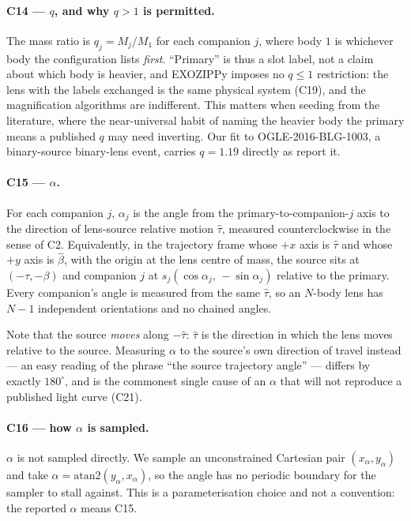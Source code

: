 \paragraph{C14 --- $q$, and why $q > 1$ is permitted.}  The mass ratio is
$q_j = M_j / M_1$ for each companion $j$, where body $1$ is whichever body
the configuration lists \emph{first}.  ``Primary'' is thus a slot label, not
a claim about which body is heavier, and EXOZIPPy imposes no $q \le 1$
restriction: the lens with the labels exchanged is the same physical system
(C19), and the magnification algorithms are indifferent.  This matters when
seeding from the literature, where the near-universal habit of naming the
heavier body the primary means a published $q$ may need inverting.  Our fit
to OGLE-2016-BLG-1003, a binary-source binary-lens event, carries
$q = 1.19$ directly as \citet{Jung:2017} report it.

\paragraph{C15 --- $\alpha$.}  For each companion $j$, $\alpha_j$ is the
angle from the primary-to-companion-$j$ axis to the direction of
lens-source relative motion $\hat{\tau}$, measured counterclockwise in the
sense of C2.  Equivalently, in the trajectory frame whose $+x$ axis is
$\hat{\tau}$ and whose $+y$ axis is $\hat{\beta}$, with the origin at the
lens centre of mass, the source sits at $(-\tau, -\beta)$ and companion $j$
at $s_j(\cos\alpha_j,\, -\sin\alpha_j)$ relative to the primary.  Every
companion's angle is measured from the same $\hat{\tau}$, so an $N$-body
lens has $N-1$ independent orientations and no chained angles.

Note that the source \emph{moves} along $-\hat{\tau}$: $\hat{\tau}$ is the
direction in which the lens moves relative to the source.  Measuring
$\alpha$ to the source's own direction of travel instead --- an easy reading
of the phrase ``the source trajectory angle'' --- differs by exactly
$180^\circ$, and is the commonest single cause of an $\alpha$ that will not
reproduce a published light curve (C21).

\paragraph{C16 --- how $\alpha$ is sampled.}  $\alpha$ is not sampled
directly.  We sample an unconstrained Cartesian pair
$(x_\alpha, y_\alpha)$ and take $\alpha = \mathrm{atan2}(y_\alpha, x_\alpha)$, so
the angle has no periodic boundary for the sampler to stall against.  This
is a parameterisation choice and not a convention: the reported $\alpha$
means C15.

